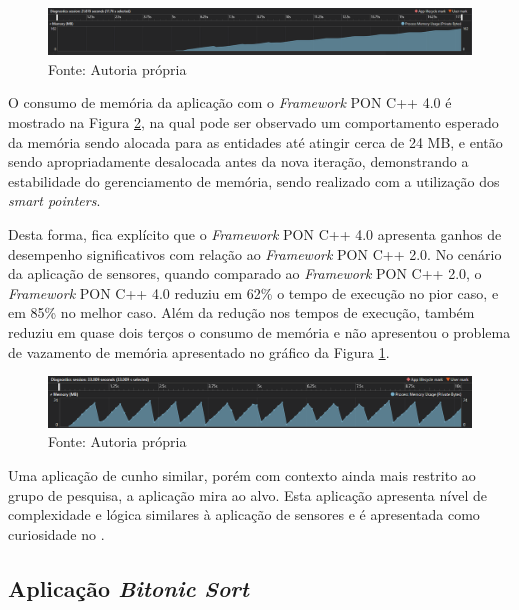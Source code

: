 \begin{figure}[!htb]
\centering
\caption{Consumo de memória \textit{Framework} PON C++ 2.0}
\includegraphics[width=\textwidth]{../figures/fw2_mem.png}
\smallskip
\caption*{Fonte: Autoria própria}
\label{fig:fw2_mem}
\end{figure}

O consumo de memória da aplicação com o \textit{Framework} PON C++ 4.0 é
mostrado na Figura \ref{fig:fw4_mem}, na qual pode ser observado um
comportamento esperado da memória sendo alocada para as entidades até atingir
cerca de 24 MB, e então sendo apropriadamente desalocada antes da nova iteração,
demonstrando a estabilidade do gerenciamento de memória, sendo realizado com a
utilização dos \textit{smart pointers}.

Desta forma, fica explícito que o \textit{Framework} PON C++ 4.0 apresenta
ganhos de desempenho significativos com relação ao \textit{Framework} PON C++
2.0. No cenário da aplicação de sensores, quando comparado ao \textit{Framework}
PON C++ 2.0, o \textit{Framework} PON C++ 4.0 reduziu em 62\% o tempo de
execução no pior caso, e em 85\% no melhor caso. Além da redução nos tempos de
execução, também reduziu em quase dois terços o consumo de memória e não
apresentou o problema de vazamento de memória apresentado no gráfico da Figura
\ref{fig:fw2_mem}.

\begin{figure}[!htb]
\centering
\caption{Consumo de memória \textit{Framework} PON C++ 4.0}
\includegraphics[width=\textwidth]{../figures/fw4_mem.png}
\smallskip
\caption*{Fonte: Autoria própria}
\label{fig:fw4_mem}
\end{figure}

Uma aplicação de cunho similar, porém com contexto ainda mais restrito ao grupo
de pesquisa, a aplicação mira ao alvo. Esta aplicação apresenta nível de
complexidade e lógica similares à aplicação de sensores e é apresentada como
curiosidade no .

\subsection{Aplicação \textit{Bitonic Sort}}\label{sec:bitonic_sort}

